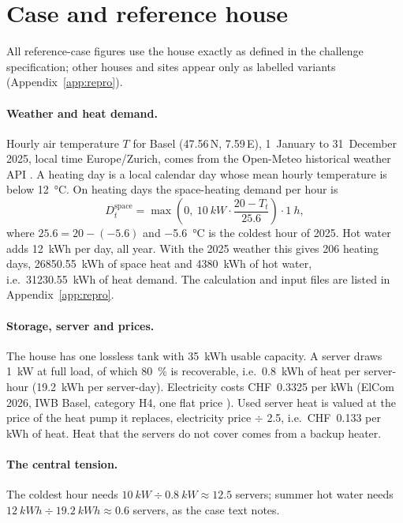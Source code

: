 \section{Case and reference house}
\label{sec:case}

All reference-case figures use the house exactly as defined in the challenge specification;
other houses and sites appear only as labelled variants (Appendix~\ref{app:repro}).

\paragraph{Weather and heat demand.} Hourly air temperature $T$ for Basel (47.56\,N, 7.59\,E),
1~January to 31~December 2025, local time Europe/Zurich, comes from the Open-Meteo historical
weather API \cite{openmeteo}. A heating day is a local calendar day whose mean hourly temperature is
below \qty{12}{\celsius}. On heating days the space-heating demand per hour is
\begin{equation}
  D^{\mathrm{space}}_t = \max\!\left(0,\ \qty{10}{kW} \cdot \frac{20 - T_t}{25.6}\right)\cdot \qty{1}{h},
  \label{eq:heating}
\end{equation}
where $25.6 = 20 - (-5.6)$ and \qty{-5.6}{\celsius} is the coldest hour of 2025. Hot water adds
\qty{12}{kWh} per day, all year. With the 2025 weather this gives 206 heating days,
\qty{26850.55}{kWh} of space heat and \qty{4380}{kWh} of hot water, i.e.\ \qty{31230.55}{kWh} of heat
demand. The calculation and input files are listed in Appendix~\ref{app:repro}.

\paragraph{Storage, server and prices.} The house has one lossless tank with \qty{35}{kWh} usable
capacity. A server draws \qty{1}{kW} at full load, of which \qty{80}{\percent} is recoverable, i.e.\
\qty{0.8}{kWh} of heat per server-hour (\qty{19.2}{kWh} per server-day). Electricity costs
CHF~0.3325 per kWh (ElCom 2026, IWB Basel, category H4, one flat price \cite{elcom}). Used server
heat is valued at the price of the heat pump it replaces, electricity price $\div$ 2.5, i.e.\
CHF~0.133 per kWh of heat. Heat that the servers do not cover comes from a backup heater.

\paragraph{The central tension.} The coldest hour needs $\qty{10}{kW} \div \qty{0.8}{kW} \approx 12.5$
servers; summer hot water needs $\qty{12}{kWh} \div \qty{19.2}{kWh} \approx 0.6$ servers, as the
case text notes.
